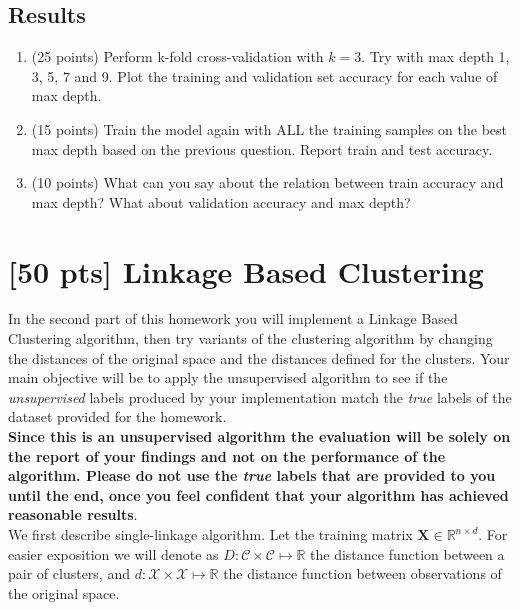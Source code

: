 \documentclass{article}
\begin{document}
\subsection{Results}
\begin{enumerate}[a]
\item (25 points) Perform k-fold cross-validation with $k=3$. Try with max depth 1, 3, 5, 7 and 9. Plot the training and validation set accuracy for each value of max depth.
\item (15 points) Train the model again with ALL the training samples on the best max depth based on the previous question. Report train and test accuracy.
\item (10 points) What can you say about the relation between train accuracy and max depth? What about validation accuracy and max depth?


\end{enumerate}

\section{ [50 pts] Linkage Based Clustering}

In the second part of this homework you will implement a Linkage Based Clustering algorithm, then try variants of the clustering algorithm by changing the distances of the original space and the distances defined for the clusters. Your main objective will be to apply the unsupervised algorithm to see if the \textit{unsupervised} labels produced by your implementation match the \textit{true} labels of the dataset provided for the homework.\\

\textbf{Since this is an unsupervised algorithm the evaluation will be solely on the report of your findings and not on the performance of the algorithm. Please do not use the \textit{true} labels that are provided to you until the end, once you feel confident that your algorithm has achieved reasonable results}. \\

We first describe single-linkage algorithm. Let the training matrix $\mathbf{X}\in\mathbb{R}^{n\times d}$. For easier exposition we will denote as $D: \mathcal{C}\times\mathcal{C}\mapsto \mathbb{R}$ the distance function between a pair of clusters, and $d:\mathcal{X}\times \mathcal{X}\mapsto \mathbb{R}$ the distance function between observations of the original space.

\vspace{5mm}
\end{document}
